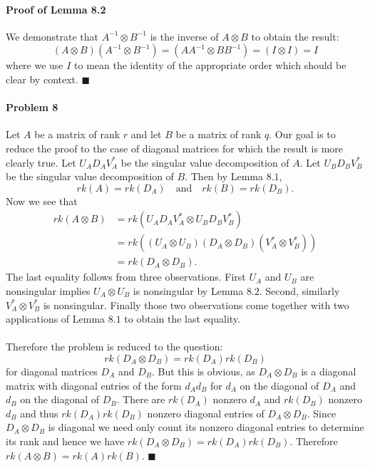\documentclass[letterpaper,12pt,oneside,onecolumn]{article}
\begin{document}
\paragraph{Proof of Lemma 8.2}
We demonstrate that $A^{-1} \otimes B^{-1}$ is the inverse of $A \otimes B$ to obtain the result:
$$(A \otimes B)(A^{-1} \otimes B^{-1}) = (AA^{-1} \otimes BB^{-1}) = (I \otimes I) = I $$
where we use $I$ to mean the identity of the appropriate order which should be clear by context. $\blacksquare$
\paragraph{Problem 8}
Let $A$ be a matrix of rank $r$ and let $B$ be a matrix of rank $q$. Our goal is to reduce the proof to the case of diagonal matrices for which the result is more clearly true. Let $U_AD_AV_A^*$ be the singular value decomposition of $A$. Let $U_BD_BV_B^*$ be the singular value decomposition of $B$. Then by Lemma $8.1$,
$$rk(A) = rk(D_A) \quad \text{and} \quad rk(B) = rk(D_B).$$ 
Now we see that
\begin{align*}
rk(A\otimes B) &= rk(U_AD_AV_A^* \otimes U_BD_BV_B^*) \\
&= rk((U_A \otimes U_B)(D_A \otimes D_B)(V_A^* \otimes V_B^*)) \\
&= rk(D_A \otimes D_B).
\end{align*}
The last equality follows from three observations. First $U_A$ and $U_B$ are nonsingular implies $U_A \otimes U_B$ is nonsingular by Lemma $8.2$. Second, similarly $V_A^* \otimes V_B^*$ is nonsingular. Finally those two observations come together with two applications of Lemma $8.1$ to obtain the last equality.
\paragraph{}
Therefore the problem is reduced to the question:
$$rk(D_A \otimes D_B) = rk(D_A)rk(D_B) $$
for diagonal matrices $D_A$ and $D_B$. But this is obvious, as $D_A \otimes D_B$ is a diagonal matrix with diagonal entries of the form $d_Ad_B$ for $d_A$ on the diagonal of $D_A$ and $d_B$ on the diagonal of $D_B$. There are $rk(D_A)$ nonzero $d_A$ and $rk(D_B)$ nonzero $d_B$ and thus $rk(D_A)rk(D_B)$ nonzero diagonal entries of $D_A \otimes D_B$. Since $D_A \otimes D_B$ is diagonal we need only count its nonzero diagonal entries to determine its rank and hence we have $rk(D_A \otimes D_B) = rk(D_A)rk(D_B)$. Therefore $rk(A \otimes B) = rk(A)rk(B)$. $\blacksquare$
\end{document}
